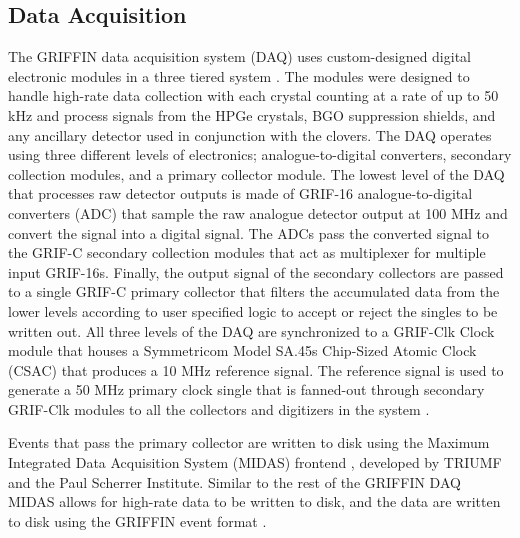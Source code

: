 \documentclass[cnatzke_thesis_proposal.tex]{subfiles}
\begin{document}
\subsection{Data Acquisition}
\label{sec:data_acquisition}
The GRIFFIN data acquisition system (DAQ) uses custom-designed digital electronic modules in a three tiered system \cite{garnsworthy_griffin_2017}. 
The modules were designed to handle high-rate data collection with each crystal counting at a rate of up to 50 kHz and process signals from the HPGe crystals, BGO suppression shields, and any ancillary detector used in conjunction with the clovers. 
The DAQ operates using three different levels of electronics; analogue-to-digital converters, secondary collection modules, and a primary collector module. The lowest level of the DAQ that processes raw detector outputs is made of GRIF-16 analogue-to-digital converters (ADC) that sample the raw analogue detector output at 100 MHz and convert the signal into a digital signal.
The ADCs pass the converted signal to the GRIF-C secondary collection modules that act as multiplexer for multiple input GRIF-16s. 
Finally, the output signal of the secondary collectors are passed to a single GRIF-C primary collector that filters the accumulated data from the lower levels according to user specified logic to accept or reject the singles to be written out. 
All three levels of the DAQ are synchronized to a GRIF-Clk Clock module that houses a Symmetricom Model SA.45s Chip-Sized Atomic Clock (CSAC) that produces a 10 MHz reference signal. 
The reference signal is used to generate a 50 MHz primary clock single that is fanned-out through secondary GRIF-Clk modules to all the collectors and digitizers in the system \cite{garnsworthy_griffin_2017}.

Events that pass the primary collector are written to disk using the Maximum Integrated Data Acquisition System (MIDAS) frontend \cite{ritt_midas_1997}, developed by TRIUMF and the Paul Scherrer Institute. 
Similar to the rest of the GRIFFIN DAQ MIDAS allows for high-rate data to be written to disk, and the data are written to disk using the GRIFFIN event format \cite{griffin_griffin_nodate}. 

\end{document}
